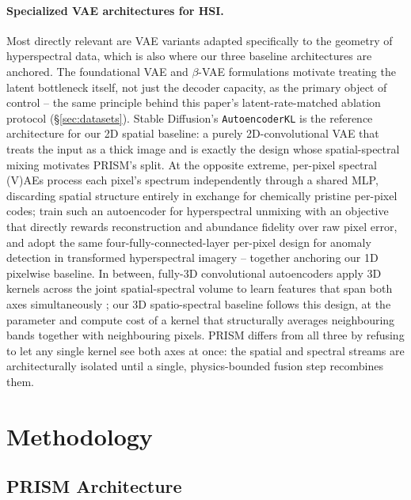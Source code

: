 \documentclass{article} %
\begin{document}
\paragraph{Specialized VAE architectures for HSI.} Most directly relevant are VAE variants adapted specifically to the geometry of hyperspectral data, which is also where our three baseline architectures are anchored. The foundational VAE and $\beta$-VAE formulations \citep{kingma2014vae, higgins2017betavae} motivate treating the latent bottleneck itself, not just the decoder capacity, as the primary object of control -- the same principle behind this paper's latent-rate-matched ablation protocol (\S\ref{sec:datasets}). Stable Diffusion's \texttt{AutoencoderKL} \citep{rombach2022ldm} is the reference architecture for our 2D spatial baseline: a purely 2D-convolutional VAE that treats the input as a thick image and is exactly the design whose spatial-spectral mixing motivates PRISM's split. At the opposite extreme, per-pixel spectral (V)AEs process each pixel's spectrum independently through a shared MLP, discarding spatial structure entirely in exchange for chemically pristine per-pixel codes; \citet{palsson2018unmixing} train such an autoencoder for hyperspectral unmixing with an objective that directly rewards reconstruction and abundance fidelity over raw pixel error, and \citet{liu2022dualfreq} adopt the same four-fully-connected-layer per-pixel design for anomaly detection in transformed hyperspectral imagery -- together anchoring our 1D pixelwise baseline. In between, fully-3D convolutional autoencoders apply 3D kernels across the joint spatial-spectral volume to learn features that span both axes simultaneously \citep{chen2016deep}; our 3D spatio-spectral baseline follows this design, at the parameter and compute cost of a kernel that structurally averages neighbouring bands together with neighbouring pixels. PRISM differs from all three by refusing to let any single kernel see both axes at once: the spatial and spectral streams are architecturally isolated until a single, physics-bounded fusion step recombines them.

\section{Methodology}

\subsection{PRISM Architecture}
\label{sec:architecture}
\end{document}
